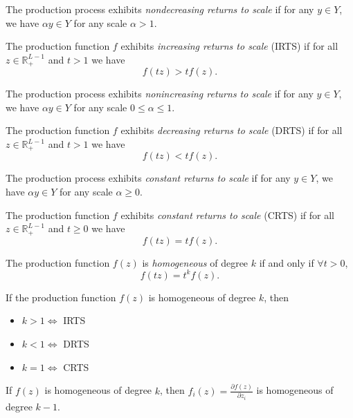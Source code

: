 \documentclass[12pt,fleqn]{book} %
\begin{document}
\begin{definition}
	The	production process exhibits \emph{nondecreasing returns to scale} if for any $y\in Y$, we have $\alpha y\in Y$ for any scale $\alpha > 1$. 
	
	The	production function $f$ exhibits \emph{increasing returns to scale} (IRTS) if for all $z\in\mathbb{R}_+^{L-1}$ and $t>1$ we have
	\[
		f(tz)> tf(z). 
	\]

\end{definition}

\begin{definition}
	The	production process exhibits \emph{nonincreasing returns to scale} if for any $y\in Y$, we have $\alpha y\in Y$ for any scale $0\le\alpha\le1$. 
	
	The	production function $f$ exhibits \emph{decreasing returns to scale} (DRTS) if for all $z\in\mathbb{R}_+^{L-1}$ and $t>1$ we have
    \[
    f(tz)< tf(z). 
    \]	
\end{definition}

\begin{definition}
	The	production process exhibits \emph{constant returns to scale} if for any $y\in Y$, we have $\alpha y\in Y$ for any scale $\alpha\ge0$. 
	
	The	production function $f$ exhibits \emph{constant returns to scale} (CRTS) if for all $z\in\mathbb{R}_+^{L-1}$ and $t\ge0$ we have
	\[
	f(tz)=tf(z). 
	\]	
\end{definition}

\begin{definition}[Homogeneity]
	The	production function $f(z)$ is \emph{homogeneous} of degree $k$ if and only if $\forall t > 0$,
	\[
	f (tz) = t^k f (z).
	\]	
\end{definition}

\begin{proposition}
	If the production function $f(z)$ is homogeneous of degree $k$, then
	\begin{itemize}
		\item $k > 1 \iff$ IRTS
		\item $k < 1 \iff$ DRTS
		\item $k = 1 \iff$ CRTS
	\end{itemize}

\end{proposition}

\begin{proposition}
	If $f(z)$ is homogeneous of degree $k$, then $f_i(z)=\frac{\partial f(z)}{\partial z_i}$ is homogeneous of degree $k-1$.
\end{proposition}
\end{document}
